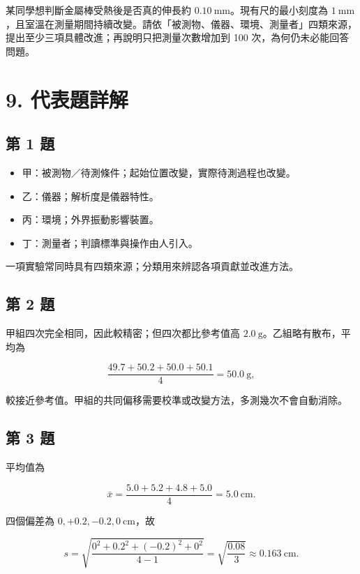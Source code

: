\documentclass[11pt,a4paper]{article}
\providecommand{\tightlist}{%
  \setlength{\itemsep}{0pt}\setlength{\parskip}{0pt}}
\begin{document}
某同學想判斷金屬棒受熱後是否真的伸長約 \(0.10\ \mathrm{mm}\)。現有尺的最小刻度為 \(1\ \mathrm{mm}\)，且室溫在測量期間持續改變。請依「被測物、儀器、環境、測量者」四類來源，提出至少三項具體改進；再說明只把測量次數增加到 100 次，為何仍未必能回答問題。

\section{9. 代表題詳解}\label{ux4ee3ux8868ux984cux8a73ux89e3}

\subsection{第 1 題}\label{ux7b2c-1-ux984c}

\begin{itemize}
\tightlist
\item
  甲：被測物／待測條件；起始位置改變，實際待測過程也改變。
\item
  乙：儀器；解析度是儀器特性。
\item
  丙：環境；外界振動影響裝置。
\item
  丁：測量者；判讀標準與操作由人引入。
\end{itemize}

一項實驗常同時具有四類來源；分類用來辨認各項貢獻並改進方法。

\subsection{第 2 題}\label{ux7b2c-2-ux984c}

甲組四次完全相同，因此較精密；但四次都比參考值高 \(2.0\ \mathrm{g}\)。乙組略有散布，平均為

\[
\frac{49.7+50.2+50.0+50.1}{4}=50.0\ \mathrm{g},
\]

較接近參考值。甲組的共同偏移需要校準或改變方法，多測幾次不會自動消除。

\subsection{第 3 題}\label{ux7b2c-3-ux984c}

平均值為

\[
\bar x=\frac{5.0+5.2+4.8+5.0}{4}=5.0\ \mathrm{cm}.
\]

四個偏差為 \(0,+0.2,-0.2,0\ \mathrm{cm}\)，故

\[
s=\sqrt{\frac{0^2+0.2^2+(-0.2)^2+0^2}{4-1}}
=\sqrt{\frac{0.08}{3}}
\approx0.163\ \mathrm{cm}.
\]
\end{document}
